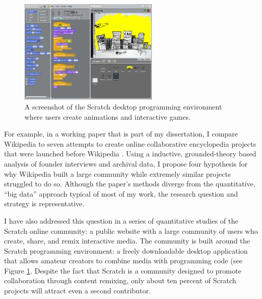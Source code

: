 \documentclass[10pt]{memoir}
\begin{document}

\begin{figure}
 \begin{centering}
 \includegraphics[width=2.6in]{figures/scratch_screenshot_default.png}
 \caption{A screenshot of the Scratch desktop programming environment
   where users create animations and interactive games.}
 \label{fig:scratchapp}
 \end{centering}
 \vspace{-2em}
\end{figure}


For example, in a working paper that is part of my dissertation, I
compare Wikipedia to seven attempts to create online collaborative
encyclopedia projects that were launched before Wikipedia
\cite{hill_almost_2012}. Using a inductive, grounded-theory based
analysis of founder interviews and archival data, I propose four
hypothesis for why Wikipedia built a large community while extremely
similar projects struggled to do so. Although the paper's methods
diverge from the quantitative, ``big data'' approach typical of most
of my work, the research question and strategy is representative.

I have also addressed this question in a series of quantitative
studies of the Scratch online community: a public website with a large
community of users who create, share, and remix interactive media. The
community is built around the Scratch programming environment: a
freely downloadable desktop application that allows amateur creators
to combine media with programming code (see Figure
\ref{fig:scratchapp}. Despite the fact that Scratch is a community
designed to promote collaboration through content remixing, only about
ten percent of Scratch projects will attract even a second
contributor.
\end{document}
